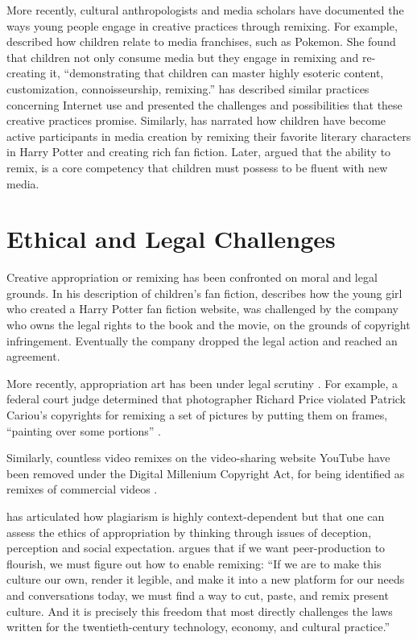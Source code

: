 More recently, cultural anthropologists and media scholars have documented the ways young people engage in creative practices through remixing. 
For example, \citet{ito_technologies_2007} described how children relate to media franchises, such as Pokemon.
She found that children not only consume media but they engage in remixing and re-creating it, ``demonstrating that children can master highly esoteric content, customization, connoisseurship, remixing.''
\citet{livingstone_taking_2008} has described similar practices concerning Internet use and presented the challenges and possibilities that these creative practices promise.
Similarly, \citet{jenkins_convergence_2006} has narrated how children have become active participants in media creation by remixing their favorite literary characters in Harry Potter and creating rich fan fiction.
Later, \citet{jenkins_confronting_2009} argued that the ability to remix, is a core competency that children must possess to be fluent with new media.

\section{Ethical and Legal Challenges}

Creative appropriation or remixing has been confronted on moral and legal grounds.
In his description of children's fan fiction, \citet{jenkins_convergence_2006} describes how the young girl who created a Harry Potter fan fiction website, was challenged by the company who owns the legal rights to the book and the movie, on the grounds of copyright infringement.
Eventually the company dropped the legal action and reached an agreement.

More recently, appropriation art has been under legal scrutiny \citep{greenberg_art_1992,landes_copyright_2000}. 
For example, a federal court judge determined that photographer Richard Price violated Patrick Cariou's copyrights for remixing a set of pictures by putting them on frames, ``painting over some portions'' \citep{batts_patrick_2011}.

Similarly, countless video remixes on the video-sharing website YouTube have been removed under the Digital Millenium Copyright Act, for being identified as remixes of commercial videos \citep{seneviratne_remix_2010}.

\citet{posner_little_2007} has articulated how plagiarism is highly context-dependent but that one can assess the ethics of appropriation by thinking through issues of deception, perception and social expectation.
\citet{benkler_wealth_2006} argues that if we want peer-production to flourish, we must figure out how to enable remixing:
``If we are to make this culture our own, render it legible, and make it into a new platform for our needs and conversations today, we must find a way to cut, paste, and remix present culture. And it is precisely this freedom that most directly challenges the laws written for the twentieth-century technology, economy, and cultural practice.''

